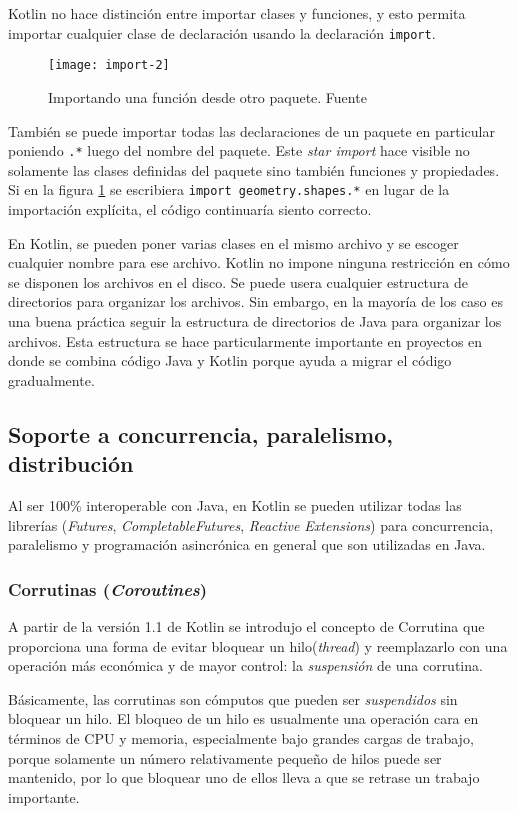Kotlin no hace distinción entre importar clases y funciones, y esto permita importar cualquier clase de declaración usando la declaración \texttt{import}.

\begin{figure}[h!]
  \texttt{[image: import-2]}
  \caption{Importando una función desde otro paquete. Fuente \cite{kotlin-in-action}}
  \label{fig:import-2}
\end{figure}

También se puede importar todas las declaraciones de un paquete en particular poniendo \texttt{.*} luego del nombre del paquete. Este \emph{star import} hace visible no solamente las clases definidas del paquete sino también funciones y propiedades. Si en la figura \ref{fig:import-2} se escribiera \texttt{import geometry.shapes.*} en lugar de la importación explícita, el código continuaría siento correcto.

En Kotlin, se pueden poner varias clases en el mismo archivo y se escoger cualquier nombre para ese archivo. Kotlin no impone ninguna restricción en cómo se disponen los archivos en el disco. Se puede usera cualquier estructura de directorios para organizar los archivos. Sin embargo, en la mayoría de los caso es una buena práctica seguir la estructura de directorios de Java para organizar los archivos. Esta estructura se hace particularmente importante en proyectos en donde se combina código Java y Kotlin porque ayuda a migrar el código gradualmente.

\subsection{Soporte a concurrencia, paralelismo, distribución}
Al ser 100\% interoperable con Java, en Kotlin se pueden utilizar todas las librerías (\emph{Futures}, \emph{CompletableFutures}, \emph{Reactive Extensions}) para concurrencia, paralelismo y programación asincrónica en general que son utilizadas en Java.

\subsubsection{Corrutinas (\emph{Coroutines})}
A partir de la versión 1.1 de Kotlin se introdujo el concepto de Corrutina que proporciona una forma de evitar bloquear un hilo(\emph{thread}) y reemplazarlo con una operación más económica y de mayor control: la \emph{suspensión} de una corrutina.

Básicamente, las corrutinas son cómputos que pueden ser \emph{suspendidos} sin bloquear un hilo. El bloqueo de un hilo es usualmente una operación cara en términos de CPU y memoria, especialmente bajo grandes cargas de trabajo, porque solamente un número relativamente pequeño de hilos puede ser mantenido, por lo que bloquear uno de ellos lleva a que se retrase un trabajo importante.

